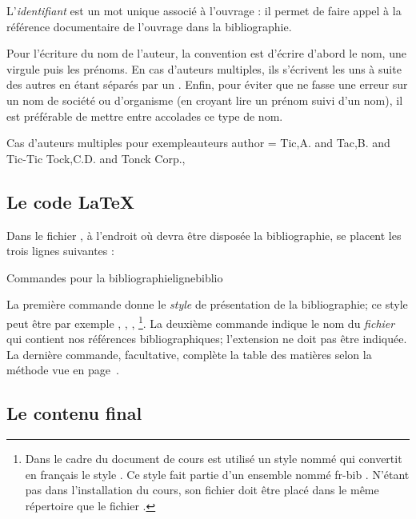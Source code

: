 L'\emph{identifiant} est un mot unique associé à l'ouvrage : il permet de faire appel à la référence documentaire de l'ouvrage dans la bibliographie. 

Pour l'écriture du nom de l'auteur, la convention est d'écrire d'abord le nom, une virgule puis les prénoms. En cas d'auteurs multiples, ils s'écrivent les uns à suite des autres en étant séparés par un . Enfin, pour éviter que \BibTeX ne fasse une erreur sur un nom de société ou d'organisme (en croyant lire un prénom suivi d'un nom), il est préférable de mettre entre accolades ce type de nom.

\begin{codesimple}{Cas d'auteurs multiples pour \BibTeX}{exempleauteurs}
author = {Tic,A. and Tac,B. and Tic-Tic Tock,C.D. and {Tonck Corp.}},
\end{codesimple}

\subsection{Le code \LaTeX}

Dans le fichier , à l'endroit où devra être disposée la bibliographie, se placent les trois lignes suivantes :

\begin{codesimple}{Commandes pour la bibliographie}{lignebiblio}


\end{codesimple}

La première commande donne le \emph{style} de présentation de la bibliographie; ce style peut être par exemple , , , \footnote{Dans le cadre du document de cours est utilisé un   style nommé  qui convertit en français le style . Ce style fait partie d'un ensemble nommé \og fr-bib \fg. N'étant pas dans l'installation du cours, son fichier  doit être placé dans le même répertoire que le fichier .}. La deuxième commande indique le nom du \emph{fichier}  qui contient nos références bibliographiques; l'extension  ne doit pas être indiquée. La dernière commande, facultative, complète la table des matières selon la méthode vue en page~\pageref{tocajout}. 


\subsection{Le contenu final}

